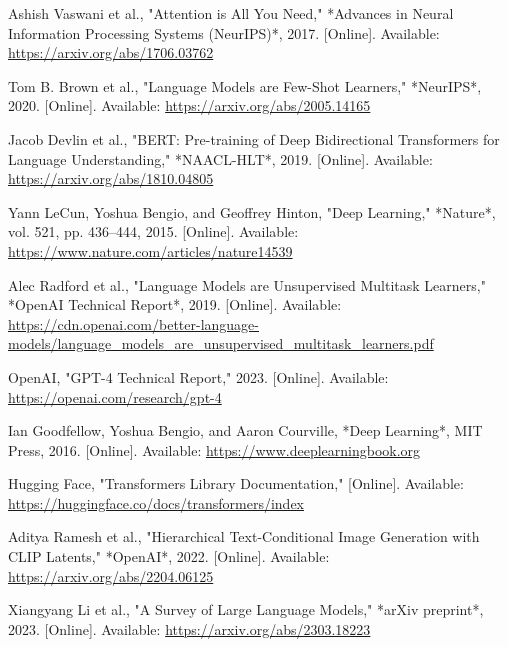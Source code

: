 \documentclass[11pt,a4paper]{report}
\begin{document}
    \begin{thebibliography}{99}

Ashish Vaswani et al., "Attention is All You Need," *Advances in Neural Information Processing Systems (NeurIPS)*, 2017. [Online]. Available: \url{https://arxiv.org/abs/1706.03762}

Tom B. Brown et al., "Language Models are Few-Shot Learners," *NeurIPS*, 2020. [Online]. Available: \url{https://arxiv.org/abs/2005.14165}

Jacob Devlin et al., "BERT: Pre-training of Deep Bidirectional Transformers for Language Understanding," *NAACL-HLT*, 2019. [Online]. Available: \url{https://arxiv.org/abs/1810.04805}

Yann LeCun, Yoshua Bengio, and Geoffrey Hinton, "Deep Learning," *Nature*, vol. 521, pp. 436–444, 2015. [Online]. Available: \url{https://www.nature.com/articles/nature14539}

Alec Radford et al., "Language Models are Unsupervised Multitask Learners," *OpenAI Technical Report*, 2019. [Online]. Available: \url{https://cdn.openai.com/better-language-models/language_models_are_unsupervised_multitask_learners.pdf}

OpenAI, "GPT-4 Technical Report," 2023. [Online]. Available: \url{https://openai.com/research/gpt-4}

Ian Goodfellow, Yoshua Bengio, and Aaron Courville, *Deep Learning*, MIT Press, 2016. [Online]. Available: \url{https://www.deeplearningbook.org}

Hugging Face, "Transformers Library Documentation," [Online]. Available: \url{https://huggingface.co/docs/transformers/index}

Aditya Ramesh et al., "Hierarchical Text-Conditional Image Generation with CLIP Latents," *OpenAI*, 2022. [Online]. Available: \url{https://arxiv.org/abs/2204.06125}

Xiangyang Li et al., "A Survey of Large Language Models," *arXiv preprint*, 2023. [Online]. Available: \url{https://arxiv.org/abs/2303.18223}

\end{thebibliography}
\end{document}
